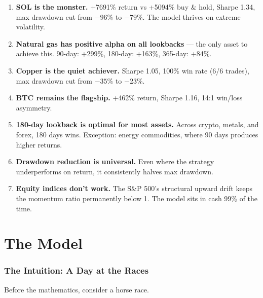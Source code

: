 \documentclass[11pt,a4paper]{article}
\begin{document}
\begin{enumerate}[leftmargin=2em]
    \item \textbf{SOL is the monster.} +7691\% return vs +5094\%
          buy \& hold, Sharpe 1.34, max drawdown cut from $-96\%$ to
          $-79\%$. The model thrives on extreme volatility.
    \item \textbf{Natural gas has positive alpha on all lookbacks}
          --- the only asset to achieve this. 90-day: +299\%, 180-day:
          +163\%, 365-day: +84\%.
    \item \textbf{Copper is the quiet achiever.} Sharpe 1.05, 100\%
          win rate (6/6 trades), max drawdown cut from $-35\%$ to $-23\%$.
    \item \textbf{BTC remains the flagship.} +462\% return, Sharpe
          1.16, 14:1 win/loss asymmetry.
    \item \textbf{180-day lookback is optimal for most assets.} Across
          crypto, metals, and forex, 180 days wins. Exception: energy
          commodities, where 90 days produces higher returns.
    \item \textbf{Drawdown reduction is universal.} Even where the
          strategy underperforms on return, it consistently halves
          max drawdown.
    \item \textbf{Equity indices don't work.} The S\&P 500's structural
          upward drift keeps the momentum ratio permanently below 1.
          The model sits in cash 99\% of the time.
\end{enumerate}

\newpage


\tableofcontents
\newpage


\part{The Model}

\section{The Intuition: A Day at the Races}

Before the mathematics, consider a horse race.
\end{document}
